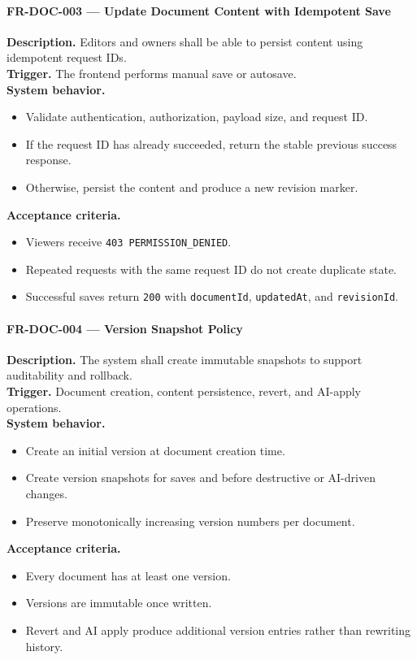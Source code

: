 \paragraph{FR-DOC-003 --- Update Document Content with Idempotent Save}
\textbf{Description.} Editors and owners shall be able to persist content using idempotent request IDs.\\
\textbf{Trigger.} The frontend performs manual save or autosave.\\
\textbf{System behavior.}
\begin{itemize}
  \item Validate authentication, authorization, payload size, and request ID.
  \item If the request ID has already succeeded, return the stable previous success response.
  \item Otherwise, persist the content and produce a new revision marker.
\end{itemize}
\textbf{Acceptance criteria.}
\begin{itemize}
  \item Viewers receive \texttt{403 PERMISSION\_DENIED}.
  \item Repeated requests with the same request ID do not create duplicate state.
  \item Successful saves return \texttt{200} with \texttt{documentId}, \texttt{updatedAt}, and \texttt{revisionId}.
\end{itemize}

\paragraph{FR-DOC-004 --- Version Snapshot Policy}
\textbf{Description.} The system shall create immutable snapshots to support auditability and rollback.\\
\textbf{Trigger.} Document creation, content persistence, revert, and AI-apply operations.\\
\textbf{System behavior.}
\begin{itemize}
  \item Create an initial version at document creation time.
  \item Create version snapshots for saves and before destructive or AI-driven changes.
  \item Preserve monotonically increasing version numbers per document.
\end{itemize}
\textbf{Acceptance criteria.}
\begin{itemize}
  \item Every document has at least one version.
  \item Versions are immutable once written.
  \item Revert and AI apply produce additional version entries rather than rewriting history.
\end{itemize}

